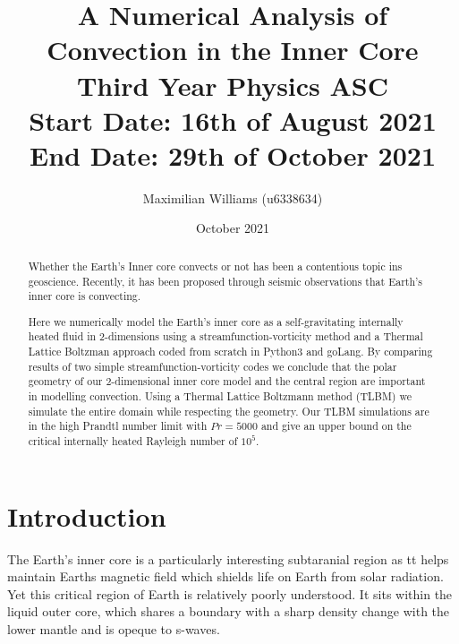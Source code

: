 \documentclass{article}
\title{%
  A Numerical Analysis of Convection in the Inner Core \\
  \large Third Year Physics ASC  \\
    Start Date: 16th of August 2021 End Date: 29th of October 2021}
\author{Maximilian Williams (u6338634)}
\date{October 2021}
\begin{document}
\maketitle

\begin{abstract}

	\noindent Whether the Earth's Inner core convects or not has been a contentious topic ins geoscience. Recently, it has been proposed through seismic 
	observations that Earth's inner core is convecting. 



	Here we numerically model the Earth's inner core as a self-gravitating internally heated fluid 
	in 2-dimensions using a streamfunction-vorticity method and a Thermal Lattice Boltzman approach coded from scratch in Python3 and goLang. By 
	comparing results of two simple 
	streamfunction-vorticity codes we conclude that the polar geometry of our 2-dimensional inner core model and the central region are important in 
	modelling convection. Using a Thermal Lattice Boltzmann method (TLBM) we simulate the entire domain while respecting the geometry. Our TLBM simulations are in the high Prandtl number limit with $Pr=5000$ and give an upper bound on the critical internally heated Rayleigh number of $10^5$. 
 
\end{abstract}

\section*{Introduction}


The Earth's inner core is a particularly interesting subtaranial region as tt helps maintain Earths magnetic field which shields life on Earth from solar 
radiation. Yet this critical region of Earth is relatively poorly understood. It sits within the liquid outer core, which shares a boundary with a sharp density change with the lower mantle and is opeque to s-waves. 
\end{document}
